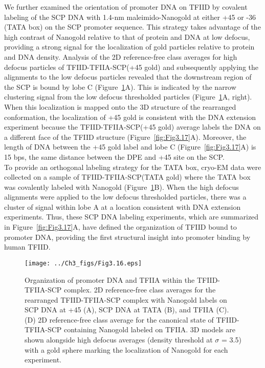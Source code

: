 \indent We further examined the orientation of promoter DNA on TFIID by covalent labeling of the SCP DNA with 1.4-nm maleimido-Nanogold at either +45 or -36 (TATA box) on the SCP promoter sequence. This strategy takes advantage of the high contrast of Nanogold relative to that of protein and DNA at low defocus, providing a strong signal for the localization of gold particles relative to protein and DNA density. Analysis of the 2D reference-free class averages for high defocus particles of TFIID-TFIIA-SCP(+45 gold) and subsequently applying the alignments to the low defocus particles revealed that the downstream region of the SCP is bound by lobe C (Figure~\ref{fig:Fig3.16}A). This is indicated by the narrow clustering signal from the low defocus thresholded particles (Figure~\ref{fig:Fig3.16}A, right). When this localization is mapped onto the 3D structure of the rearranged conformation, the localization of +45 gold is consistent with the DNA extension experiment because the TFIID-TFIIA-SCP(+45 gold) average labels the DNA on a different face of the TFIID structure (Figure~\ref{fig:Fig3.17}A). Moreover, the length of DNA between the +45 gold label and lobe C (Figure~\ref{fig:Fig3.17}A) is 15 bps, the same distance between the DPE and +45 site on the SCP.\\ 
\indent To provide an orthogonal labeling strategy for the TATA box, cryo-EM data were collected on a sample of TFIID-TFIIA-SCP(TATA gold) where the TATA box was covalently labeled with Nanogold (Figure~\ref{fig:Fig3.16}B). When the high defocus alignments were applied to the low defocus thresholded particles, there was a cluster of signal within lobe A at a location consistent with DNA extension experiments. Thus, these SCP DNA labeling experiments, which are summarized in Figure~\ref{fig:Fig3.17}A, have defined the organization of TFIID bound to promoter DNA, providing the first structural insight into promoter binding by human TFIID. \\
\begin{figure}
\centering
\texttt{[image: ../Ch3\_figs/Fig3.16.eps]}
\caption[Organization of promoter DNA and TFIIA within the TFIID-TFIIA-SCP complex]{Organization of promoter DNA and TFIIA within the TFIID-TFIIA-SCP complex. 2D reference-free class averages for the rearranged TFIID-TFIIA-SCP complex with Nanogold labels on SCP DNA at +45 (A), SCP DNA at TATA (B), and TFIIA (C). (D) 2D reference-free class average for the canonical state of TFIID-TFIIA-SCP containing Nanogold labeled on TFIIA. 3D models are shown alongside high defocus averages (density threshold at $\sigma$ = 3.5) with a gold sphere marking the localization of Nanogold for each experiment. }
\label{fig:Fig3.16}
\end{figure}

